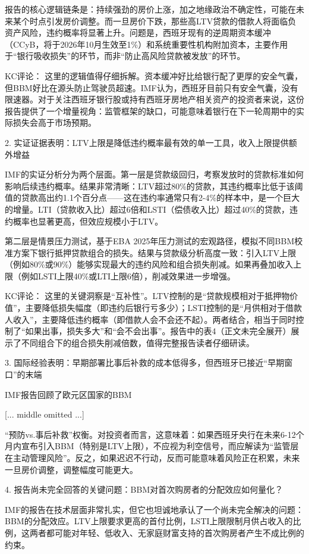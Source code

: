 \documentclass[11pt]{ctexart}
\begin{document}
报告的核心逻辑链条是：持续强劲的房价上涨，加之地缘政治不确定性，可能在未来某个时点引发房价调整。而一旦房价下跌，那些高LTV贷款的借款人将面临负资产风险，违约概率将显著上升。问题是，西班牙现有的逆周期资本缓冲（CCyB，将于2026年10月生效至1\%）和系统重要性机构附加资本，主要作用于“银行吸收损失”的环节，而非“防止高风险贷款被发放”的环节。

KC评论： 这里的逻辑值得仔细拆解。资本缓冲好比给银行配了更厚的安全气囊，但BBM好比在源头防止驾驶员超速。IMF认为，西班牙目前只有安全气囊，没有限速器。对于关注西班牙银行股或持有西班牙房地产相关资产的投资者来说，这份报告提供了一个增量视角：监管框架的缺口，可能意味着银行在下一轮周期中的实际损失会高于市场预期。

2. 实证证据表明：LTV上限是降低违约概率最有效的单一工具，收入上限提供额外增益

IMF的实证分析分为两个层面。第一层是贷款级回归，考察发放时的贷款标准如何影响后续违约概率。结果非常清晰：LTV超过80\%的贷款，其违约概率比低于该阈值的贷款高出约1.1个百分点——这在违约率通常只有2-4\%的样本中，是一个巨大的增量。LTI（贷款收入比）超过6倍和LSTI（偿债收入比）超过40\%的贷款，违约概率也显著更高，但效应规模小于LTV。

第二层是情景压力测试，基于EBA 2025年压力测试的宏观路径，模拟不同BBM校准方案下银行抵押贷款组合的损失。结果与贷款级分析高度一致：引入LTV上限（例如80\%或90\%）能够实现最大的违约风险和组合损失削减。如果再叠加收入上限（例如LSTI上限40\%或LTI上限6倍），削减效果进一步增强。

KC评论： 这里的关键洞察是“互补性”。LTV控制的是“贷款规模相对于抵押物价值”，主要降低损失幅度（即违约后银行亏多少）；LSTI控制的是“月供相对于借款人收入”，主要降低违约概率（即借款人会不会还不起）。两者结合，相当于同时控制了“如果出事，损失多大”和“会不会出事”。报告中的表4（正文未完全展开）展示了不同组合下的组合损失削减倍数，值得完整报告读者仔细研读。

3. 国际经验表明：早期部署比事后补救的成本低得多，但西班牙已接近“早期窗口”的末端

IMF报告回顾了欧元区国家的BBM

[... middle omitted ...]

“预防vs.事后补救”权衡。对投资者而言，这意味着：如果西班牙央行在未来6-12个月内宣布引入BBM（特别是LTV上限），不应视为利空信号，而应解读为“监管层在主动管理风险”。反之，如果迟迟不行动，反而可能意味着风险正在积累，未来一旦房价调整，调整幅度可能更大。

4. 报告尚未完全回答的关键问题：BBM对首次购房者的分配效应如何量化？

IMF的报告在技术层面非常扎实，但它也坦诚地承认了一个尚未完全解决的问题：BBM的分配效应。LTV上限要求更高的首付比例，LSTI上限限制月供占收入的比例，这两者都可能对年轻、低收入、无家庭财富支持的首次购房者产生不成比例的约束。
\end{document}
